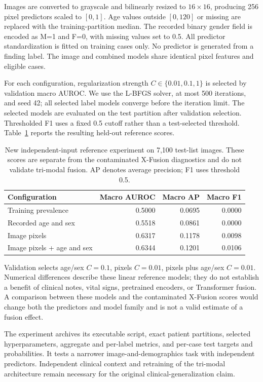 \documentclass[runningheads,a4paper]{llncs}
\begin{document}
Images are converted to grayscale and bilinearly resized to $16\times16$, producing 256 pixel predictors scaled to $[0,1]$. Age values outside $[0,120]$ or missing are replaced with the training-partition median. The recorded binary gender field is encoded as M=1 and F=0, with missing values set to 0.5. All predictor standardization is fitted on training cases only. No predictor is generated from a finding label. The image and combined models share identical pixel features and eligible cases.

For each configuration, regularization strength $C\in\{0.01,0.1,1\}$ is selected by validation macro AUROC. We use the L-BFGS solver, at most 500 iterations, and seed 42; all selected label models converge before the iteration limit. The selected models are evaluated on the test partition after validation selection. Thresholded F1 uses a fixed 0.5 cutoff rather than a test-selected threshold. Table~\ref{tab:independent} reports the resulting held-out reference scores.

\begin{table}[t]
\caption{New independent-input reference experiment on 7,100 test-list images. These scores are separate from the contaminated X-Fusion diagnostics and do not validate tri-modal fusion. AP denotes average precision; F1 uses threshold 0.5.}
\label{tab:independent}
\centering\small
\begin{tabular}{lrrr}
\toprule
Configuration & Macro AUROC & Macro AP & Macro F1\\
\midrule
Training prevalence & 0.5000 & 0.0695 & 0.0000\\
Recorded age and sex & 0.5518 & 0.0861 & 0.0000\\
Image pixels & 0.6317 & 0.1178 & 0.0098\\
Image pixels + age and sex & 0.6344 & 0.1201 & 0.0106\\
\bottomrule
\end{tabular}
\end{table}

Validation selects age/sex $C=0.1$, pixels $C=0.01$, pixels plus age/sex $C=0.01$. Numerical differences describe these linear reference models; they do not establish a benefit of clinical notes, vital signs, pretrained encoders, or Transformer fusion. A comparison between these models and the contaminated X-Fusion scores would change both the predictors and model family and is not a valid estimate of a fusion effect.

The experiment archives its executable script, exact patient partitions, selected hyperparameters, aggregate and per-label metrics, and per-case test targets and probabilities. It tests a narrower image-and-demographics task with independent predictors. Independent clinical context and retraining of the tri-modal architecture remain necessary for the original clinical-generalization claim.
\end{document}
